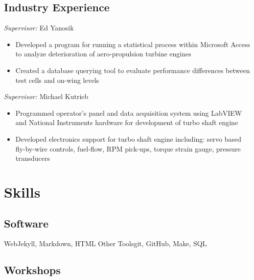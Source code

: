 \documentclass[11pt,letter,sans]{moderncv}
\begin{document}
\subsection{Industry Experience}

%
  {\textit{Supervisor:} Ed Yanosik
  \begin{itemize}
  	\item Developed a program for running a statistical process within Microsoft Access to analyze deterioration of aero-propulsion turbine engines
	\item Created a database querying tool to evaluate performance differences between test cells and on-wing levels
  \end{itemize}
  }

%
  {\textit{Supervisor:} Michael Kutrieb
  \begin{itemize}
  	\item Programmed operator's panel and data acquisition system using LabVIEW and National Instruments hardware for development of turbo shaft engine
	\item Developed electronics support for turbo shaft engine including: servo based fly-by-wire controls, fuel-flow, RPM pick-ups, torque strain gauge, pressure transducers
  \end{itemize}
  }

\section{Skills}

\subsection{Software}

           {Web}{Jekyll, Markdown, HTML}
           {Other Tools}{git, GitHub, Make, SQL}

\subsection{Workshops}

\end{document}
